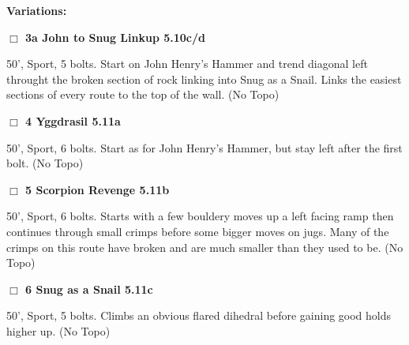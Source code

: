 \begin{multicols}{2}
\begin{adjustwidth}{0.5cm}{}				
\needspace{3cm}
\textbf{Variations:} \newline

\needspace{1.5cm}
\label{vr:John to Snug Linkup}
\colorbox{RoyalBlue!20}{
\parbox{0.95\linewidth}{
\hspace{-1ex}\textbf{$\Box$
3a John to Snug Linkup 5.10c/d  
}}}
\begin{adjustwidth}{1.3em}{}			
50', Sport, 5 bolts. Start on John Henry's Hammer and trend diagonal left throught the broken section of rock linking into Snug as a Snail. Links the easiest sections of every route to the top of the wall.
  (No Topo)
\end{adjustwidth}



\end{adjustwidth}


\needspace{1.5cm}
\label{rt:Yggdrasil}
\colorbox{RoyalBlue!20}{
\parbox{0.95\linewidth}{
\hspace{-1ex}\textbf{$\Box$
4 Yggdrasil 5.11a  
}}}
\begin{adjustwidth}{1.3em}{}			
50', Sport, 6 bolts. Start as for John Henry's Hammer, but stay left after the first bolt.
  (No Topo)
\end{adjustwidth}




\needspace{1.5cm}
\label{rt:Scorpion Revenge}
\colorbox{RoyalBlue!20}{
\parbox{0.95\linewidth}{
\hspace{-1ex}\textbf{$\Box$
5 Scorpion Revenge 5.11b  
}}}
\begin{adjustwidth}{1.3em}{}			
50', Sport, 6 bolts. Starts with a few bouldery moves up a left facing ramp then continues through small crimps before some bigger moves on jugs. Many of the crimps on this route have broken and are much smaller than they used to be.
  (No Topo)
\end{adjustwidth}




\needspace{1.5cm}
\label{rt:Snug as a Snail}
\colorbox{RoyalBlue!20}{
\parbox{0.95\linewidth}{
\hspace{-1ex}\textbf{$\Box$
6 Snug as a Snail 5.11c  
}}}
\begin{adjustwidth}{1.3em}{}			
50', Sport, 5 bolts. Climbs an obvious flared dihedral before gaining good holds higher up.
  (No Topo)
\end{adjustwidth}





\end{multicols}
